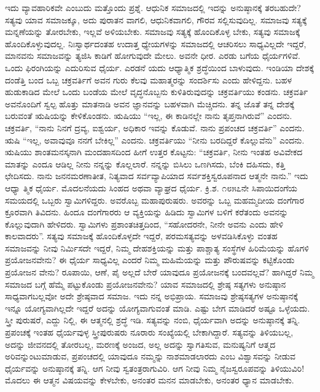 ಇದು ವ್ಯಾವಹಾರಿಕವೇ ಎಂಬುದು ಮತ್ತೊಂದು ಪ್ರಶ್ನೆ. ಆಧುನಿಕ ಸಮಾಜದಲ್ಲಿ ಇದನ್ನು ಅನುಷ್ಠಾನಕ್ಕೆ ತರಬಹುದೇ? ಸತ್ಯವು ಯಾವ ಸಮಾಜಕ್ಕೂ, ಅದು ಪುರಾತನ ವಾಗಲಿ, ಆಧುನಿಕವಾಗಲಿ, ಗೌರವ ಸಲ್ಲಿಸುವುದಿಲ್ಲ. ಸಮಾಜವು ಸತ್ಯಕ್ಕೆ ಮನ್ನಣೆಯನ್ನು ತೋರಬೇಕು, ಇಲ್ಲವೆ ಅಳಿಯಬೇಕು. ಸಮಾಜವು ಸತ್ಯಕ್ಕೆ ಹೊಂದಿಕೊಳ್ಳ ಬೇಕು, ಸತ್ಯವು ಸಮಾಜಕ್ಕೆ ಹೊಂದಿಕೊಳ್ಳುವುದಲ್ಲ. ನಿಃಸ್ವಾರ್ಥದಂತಹ ಉದಾತ್ತ ಧ್ಯೇಯಗಳನ್ನು ಸಮಾಜದಲ್ಲಿ ಆಚರಿಸಲು ಸಾಧ್ಯವಿಲ್ಲದೇ ಇದ್ದರೆ, ಮಾನವನು ಸಮಾಜವನ್ನು ತ್ಯಜಿಸಿ ಕಾಡಿಗೆ ಹೋಗುವುದೇ ಮೇಲು. ಅವನೇ ಧೀರ. ಎರಡು ಬಗೆಯ ಧೈರ್ಯಗಳಿವೆ. ಒಂದು ಫಿರಂಗಿಯನ್ನು ಎದುರಿಸುವ ಧೈರ್ಯ. ಎರಡನೆ ಯದು ಆಧ್ಯಾತ್ಮಿಕ ಶ್ರದ್ಧೆಯಿಂದ ಬಾಳುವುದು. ಇಂಡಿಯಾ ದೇಶಕ್ಕೆ ದಂಡೆತ್ತಿ ಬಂದ ಒಬ್ಬ ಚಕ್ರವರ್ತಿಗೆ ಅವನ ಗುರು ಕೆಲವು ಮಹಾತ್ಮರನ್ನು ಸಂದರ್ಶಿಸು ಎಂದು ಹೇಳಿದ್ದನು. ಬಹಳ ಹುಡುಕಾಡಿದ ಮೇಲೆ ಒಂದು ಬಂಡೆಯ ಮೇಲೆ ವೃದ್ಧನೊಬ್ಬನು ಕುಳಿತಿರುವುದನ್ನು ಚಕ್ರವರ್ತಿಯು ಕಂಡನು. ಚಕ್ರವರ್ತಿ ಅವನೊಂದಿಗೆ ಸ್ವಲ್ಪ ಹೊತ್ತು ಮಾತನಾಡಿ ಅವನ ಜ್ಞಾನವನ್ನು ಬಹಳವಾಗಿ ಮೆಚ್ಚಿದನು. ತನ್ನ ಜೊತೆ ತನ್ನ ದೇಶಕ್ಕೆ ಬರುವಂತೆ ಋಷಿಯನ್ನು ಕೇಳಿಕೊಂಡನು. ಋಷಿಯು “ಇಲ್ಲ, ಈ ಕಾಡಿನಲ್ಲೇ ನಾನು ತೃಪ್ತನಾಗಿರುವೆ” ಎಂದನು. ಚಕ್ರವರ್ತಿ, “ನಾನು ನಿನಗೆ ದ್ರವ್ಯ, ಐಶ್ವರ್ಯ, ಅಧಿಕಾರ ಇವನ್ನು ಕೊಡುವೆ. ನಾನು ಪ್ರಪಂಚದ ಚಕ್ರವರ್ತಿ” ಎಂದನು. ಋಷಿ “ಇಲ್ಲ, ಅವಾವುವೂ ನನಗೆ ಬೇಕಿಲ್ಲ” ಎಂದನು. ಚಕ್ರವರ್ತಿಯು “ನೀನು ಬರದಿದ್ದರೆ ಕೊಲ್ಲುವೆನು” ಎಂದನು. ಋಷಿಯು ಶಾಂತಮನಸ್ಕನಾಗಿ ಮಂದಹಾಸದಿಂದ ಹೀಗೆ ಉತ್ತರ ಕೊಟ್ಟನು: “ಚಕ್ರವರ್ತಿ, ನೀನು ಇಂತಹ ಅವಿವೇಕದ ಮಾತನ್ನು ಎಂದೂ ಆಡಿಲ್ಲ ನೀನು ನನ್ನನ್ನು ಕೊಲ್ಲಲಾರೆ. ನನ್ನನ್ನು ಬಿಸಿಲು ಒಣಗಿಸದು, ಬೆಂಕಿ ದಹಿಸದು, ಕತ್ತಿ ಛೇದಿಸದು. ನಾನು ಜನನಮರಣಾತೀತ, ನಿತ್ಯವಾದ ಸರ್ವವ್ಯಾಪಿಯಾದ ಸರ್ವಶಕ್ತಿಸ್ವರೂಪನಾದ ಆತ್ಮನೇ ನಾನು.” ಇದು ಆಧ್ಯಾ ತ್ಮಿಕ ಧೈರ್ಯ. ಮೊದಲನೆಯದು ಸಿಂಹದ ಅಥವಾ ವ್ಯಾಘ್ರದ ಧೈರ್ಯ. ಕ್ರಿ.ಶ. ೧೮೫೭ನೇ ಸಿಪಾಯಿದಂಗೆಯ ಸಮಯದಲ್ಲಿ ಒಬ್ಬರು ಸ್ವಾಮಿಗಳಿದ್ದರು. ಅವರೊಬ್ಬ ಮಹಾಪುರುಷರು. ಅವರನ್ನು ಒಬ್ಬ ಮಹಮ್ಮದೀಯ ದಂಗೆಗಾರ ಕ್ರೂರವಾಗಿ ತಿವಿದನು. ಹಿಂದೂ ದಂಗೆಗಾರರು ಆ ವ್ಯಕ್ತಿಯನ್ನು ಹಿಡಿದು ಸ್ವಾಮಿಗಳ ಬಳಿಗೆ ಕರೆತಂದು ಅವನನ್ನು ಕೊಲ್ಲುವುದಾಗಿ ಹೇಳಿದರು. ಸ್ವಾಮಿಗಳು ಪ್ರಶಾಂತಚಿತ್ತದಿಂದ, “ಸಹೋದರನೇ, ನೀನೇ ಅವನು ಎಂದು ಹೇಳಿ ಕಾಲವಾದರು”. ಸತ್ಯವು ಸಮಾಜಕ್ಕೆ ಹೊಂದಿಕೊಳ್ಳದೇ ಇದ್ದರೆ, ಪರಮಸತ್ಯವನ್ನು ಅಳವಡಿಸಿಕೊಳ್ಳು ವಂತಹ ಸಮಾಜವನ್ನು ನೀವು ನಿರ್ಮಿಸದೇ ಇದ್ದರೆ, ನಿಮ್ಮ ದೇಹಶಕ್ತಿಯನ್ನು ಮತ್ತು ಪಾಶ್ಚಾತ್ಯ ಸಂಸ್ಥೆಗಳ ಹಿರಿಮೆಯನ್ನು ಹೊಗಳಿ ಪ್ರಯೋಜನವೇನು? ಈ ಧೈರ್ಯ ಸಾಧ್ಯವಿಲ್ಲ ಎಂದರೆ ನಿಮ್ಮ ಮಹಿಮೆಯನ್ನು ಮತ್ತು ಪೌರುಷವನ್ನು ಕಟ್ಟಿಕೊಂಡು ಪ್ರಯೋಜನ ವೇನು? ರೂಪಾಯಿ, ಆಣೆ, ಪೈ ಅಲ್ಲದೆ ಬೇರೆ ಯಾವುದೂ ಪ್ರಯೋಜನಕ್ಕೆ ಬಂದವಲ್ಲವೆ? ಹಾಗಿದ್ದರೆ ನಿಮ್ಮ ಸಮಾಜದ ಬಗ್ಗೆ ಹೆಮ್ಮೆ ಪಟ್ಟುಕೊಂಡು ಪ್ರಯೋಜನವೇನು? ಯಾವ ಸಮಾಜದಲ್ಲಿ ಶ್ರೇಷ್ಠ ಸತ್ಯಗಳು ಅನುಷ್ಠಾನ ಸಾಧ್ಯವಾಗಬಲ್ಲವೋ ಅದೇ ಶ್ರೇಷ್ಠವಾದ ಸಮಾಜ. ಇದು ನನ್ನ ಅಭಿಪ್ರಾಯ. ಸಮಾಜವು ಶ್ರೇಷ್ಠಸತ್ಯಗಳ ಅನುಷ್ಠಾನಕ್ಕೆ ಇನ್ನೂ ಯೋಗ್ಯವಾಗಿಲ್ಲದೇ ಇದ್ದರೆ ಅದನ್ನು ಯೋಗ್ಯವಾಗುವಂತೆ ಮಾಡಿ. ಎಷ್ಟು ಬೇಗ ಮಾಡಿದರೆ ಅಷ್ಟೂ ಒಳ್ಳೆಯದು. ಸ್ತ್ರೀ ಪುರುಷರೆ, ಎದ್ದು ನಿಲ್ಲಿ, ಈ ಆತ್ಮನಲ್ಲಿ ಶ್ರದ್ಧೆ ಇಡಿ. ಸತ್ಯವನ್ನು ನಂಬಿ, ಧೈರ್ಯವಾಗಿ ಅದನ್ನು ಅನುಷ್ಠಾನಕ್ಕೆ ತನ್ನಿ. ಪ್ರಪಂಚಕ್ಕೆ ಇಂತಹ ಧೈರ್ಯವುಳ್ಳ ಸ್ತ್ರೀಪುರುಷರು ನೂರಾರು ಸಂಖ್ಯೆಯಲ್ಲಿ ಬೇಕಾಗಿದ್ದಾರೆ. ಸತ್ಯವನ್ನು ತಿಳಿಯಬಲ್ಲ, ಅದನ್ನು ಜೀವನದಲ್ಲಿ ತೋರಬಲ್ಲ, ಮರಣಕ್ಕೆ ಅಂಜದ, ಅಲ್ಲ ಅದನ್ನು ಸ್ವಾಗತಿಸುವ, ಮನುಷ್ಯನಿಗೆ ಆತ್ಮದ ಅರಿವನ್ನುಂಟುಮಾಡುವ, ಪ್ರಪಂಚದಲ್ಲಿ ಯಾವುದೂ ನಮ್ಮನ್ನು ನಾಶಮಾಡಲಾರದು ಎಂಬ ವಿಶ್ವಾಸವನ್ನು ನೀಡುವ ಧೈರ್ಯವನ್ನು ಅನುಷ್ಠಾನಕ್ಕೆ ತನ್ನಿ. ಆಗ ನೀವು ಸ್ವತಂತ್ರರಾಗುವಿರಿ. ಆಗ ನೀವು ನಿಮ್ಮ ನೈಜಸ್ವರೂಪವನ್ನು ತಿಳಿಯುವಿರಿ! ಮೊದಲು ಈ ಆತ್ಮನ ವಿಷಯವನ್ನು ಕೇಳಬೇಕು, ಅನಂತರ ಮನನ ಮಾಡಬೇಕು, ಅನಂತರ ಧ್ಯಾನ ಮಾಡಬೇಕು.

